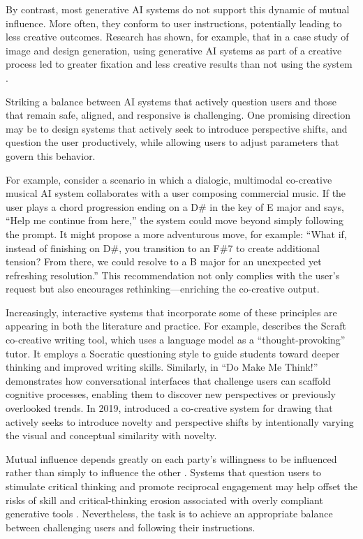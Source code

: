 By contrast, most generative AI systems do not support this dynamic of mutual influence. More often, they conform to user instructions, potentially leading to less creative outcomes. Research has shown, for example, that in a case study of image and design generation, using generative AI systems as part of a creative process led to greater fixation and less creative results than not using the system \citep{Wadinambiarachchi2024-jn}. 

Striking a balance between AI systems that actively question users and those that remain safe, aligned, and responsive is challenging. One promising direction may be to design systems that actively seek to introduce perspective shifts, and question the user productively, while allowing users to adjust parameters that govern this behavior. 

For example, consider a scenario in which a dialogic, multimodal co-creative musical AI system collaborates with a user composing commercial music. If the user plays a chord progression ending on a D\# in the key of E major and says, ``Help me continue from here,'' the system could move beyond simply following the prompt. It might propose a more adventurous move, for example: ``What if, instead of finishing on D\#, you transition to an F\#7 to create additional tension? From there, we could resolve to a B major for an unexpected yet refreshing resolution.'' This recommendation not only complies with the user's request but also encourages rethinking—enriching the co-creative output.

Increasingly, interactive systems that incorporate some of these principles are appearing in both the literature and practice. For example, \citet{Kim2023-wt} describes the Scraft co-creative writing tool, which uses a language model as a ``thought-provoking'' tutor. It employs a Socratic questioning style to guide students toward deeper thinking and improved writing skills. Similarly, in ``Do Make Me Think!'' \citet{Reicherts2020-up} demonstrates how conversational interfaces that challenge users can scaffold cognitive processes, enabling them to discover new perspectives or previously overlooked trends. In 2019, \citet{Karimi2019-io} introduced a co-creative system for drawing that actively seeks to introduce novelty and perspective shifts by intentionally varying the visual and conceptual similarity with novelty. 

Mutual influence depends greatly on each party's willingness to be influenced rather than simply to influence the other \citep{Bohm1996-fo}. Systems that question users to stimulate critical thinking and promote reciprocal engagement may help offset the risks of skill and critical-thinking erosion associated with overly compliant generative tools \citep{Abbas2024-sf, Essel2024-qc}. Nevertheless, the task is to achieve an appropriate balance between challenging users and following their instructions.

